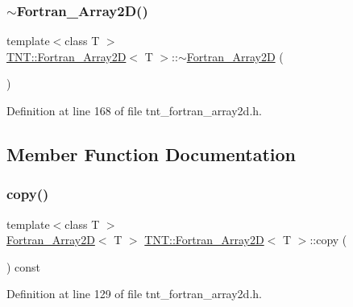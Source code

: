 \subsubsection{\texorpdfstring{$\sim$\+Fortran\+\_\+\+Array2\+D()}{~Fortran\_Array2D()}}
{\footnotesize\ttfamily template$<$class T $>$ \\
\hyperlink{classTNT_1_1Fortran__Array2D}{T\+N\+T\+::\+Fortran\+\_\+\+Array2D}$<$ T $>$\+::$\sim$\hyperlink{classTNT_1_1Fortran__Array2D}{Fortran\+\_\+\+Array2D} (\begin{DoxyParamCaption}{ }\end{DoxyParamCaption})}



Definition at line 168 of file tnt\+\_\+fortran\+\_\+array2d.\+h.



\subsection{Member Function Documentation}
\mbox{\label{classTNT_1_1Fortran__Array2D_a0486e25f2caa7291bcf025167c780e50}} 
\subsubsection{\texorpdfstring{copy()}{copy()}}
{\footnotesize\ttfamily template$<$class T $>$ \\
\hyperlink{classTNT_1_1Fortran__Array2D}{Fortran\+\_\+\+Array2D}$<$ T $>$ \hyperlink{classTNT_1_1Fortran__Array2D}{T\+N\+T\+::\+Fortran\+\_\+\+Array2D}$<$ T $>$\+::copy (\begin{DoxyParamCaption}{ }\end{DoxyParamCaption}) const}



Definition at line 129 of file tnt\+\_\+fortran\+\_\+array2d.\+h.

\mbox{\label{classTNT_1_1Fortran__Array2D_aa7aabeb85b00a5a0f268d036eb76b90f}} 
